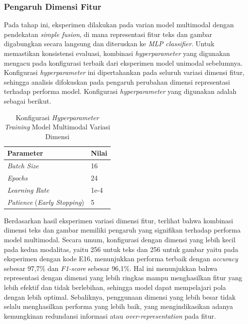 \subsubsection{Pengaruh Dimensi Fitur}
\label{IV.MultimodalDimensi}
Pada tahap ini, eksperimen dilakukan pada varian model multimodal dengan pendekatan \textit{simple fusion}, di mana representasi fitur teks dan gambar digabungkan secara langsung dan diteruskan ke \textit{MLP classifier}. Untuk memastikan konsistensi evaluasi, kombinasi \textit{hyperparameter} yang digunakan mengacu pada konfigurasi terbaik dari eksperimen model unimodal sebelumnya. Konfigurasi \textit{hyperparameter} ini dipertahankan pada seluruh variasi dimensi fitur, sehingga analisis difokuskan pada pengaruh perubahan dimensi representasi terhadap performa model. Konfigurasi \textit{hyperparameter} yang digunakan adalah sebagai berikut.

\begin{table}[H]
    \centering
    \caption{Konfigurasi \textit{Hyperparameter Training} Model Multimodal Variasi Dimensi}
    \label{table:hyperparams_terpilih}
    \small
    \setlength{\tabcolsep}{3pt}
    \renewcommand{\arraystretch}{1.1}
    \begin{tabular}{p{4.0cm} p{1.5cm}}
        \hline
        \textbf{Parameter} & \textbf{Nilai} \\
        \hline
        \textit{Batch Size} & 16 \\
        \textit{Epochs} & 24 \\
        \textit{Learning Rate} & 1e-4 \\
        \textit{Patience} (\textit{Early Stopping}) & 5 \\
        \hline
    \end{tabular}
\end{table}

Berdasarkan hasil eksperimen variasi dimensi fitur, terlihat bahwa kombinasi dimensi teks dan gambar memiliki pengaruh yang signifikan terhadap performa model multimodal. Secara umum, konfigurasi dengan dimensi yang lebih kecil pada kedua modalitas, yaitu 256 untuk teks dan 256 untuk gambar yaitu pada eksperimen dengan kode E16, menunjukkan performa terbaik dengan \textit{accuracy} sebesar 97,7\% dan \textit{F1-score} sebesar 96,1\%. Hal ini menunjukkan bahwa representasi dengan dimensi yang lebih ringkas mampu menghasilkan fitur yang lebih efektif dan tidak berlebihan, sehingga model dapat mempelajari pola dengan lebih optimal. Sebaliknya, penggunaan dimensi yang lebih besar tidak selalu menghasilkan performa yang lebih baik, yang mengindikasikan adanya kemungkinan redundansi informasi atau \textit{over-representation} pada fitur.

